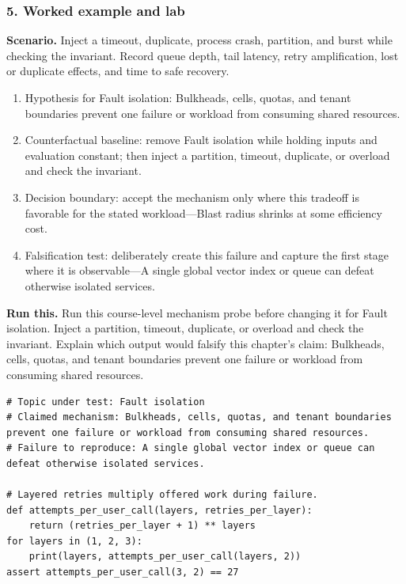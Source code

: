 \subsubsection*{5. Worked example and lab}
\textbf{Scenario.} Inject a timeout, duplicate, process crash, partition, and burst while checking the invariant. Record queue depth, tail latency, retry amplification, lost or duplicate effects, and time to safe recovery.
\begin{enumerate}
\item Hypothesis for Fault isolation: Bulkheads, cells, quotas, and tenant boundaries prevent one failure or workload from consuming shared resources.
\item Counterfactual baseline: remove Fault isolation while holding inputs and evaluation constant; then inject a partition, timeout, duplicate, or overload and check the invariant.
\item Decision boundary: accept the mechanism only where this tradeoff is favorable for the stated workload—Blast radius shrinks at some efficiency cost.
\item Falsification test: deliberately create this failure and capture the first stage where it is observable—A single global vector index or queue can defeat otherwise isolated services.
\end{enumerate}
\textbf{Run this.} Run this course-level mechanism probe before changing it for Fault isolation. Inject a partition, timeout, duplicate, or overload and check the invariant. Explain which output would falsify this chapter's claim: Bulkheads, cells, quotas, and tenant boundaries prevent one failure or workload from consuming shared resources.
\begin{Verbatim}[fontsize=\scriptsize]
# Topic under test: Fault isolation
# Claimed mechanism: Bulkheads, cells, quotas, and tenant boundaries prevent one failure or workload from consuming shared resources.
# Failure to reproduce: A single global vector index or queue can defeat otherwise isolated services.

# Layered retries multiply offered work during failure.
def attempts_per_user_call(layers, retries_per_layer):
    return (retries_per_layer + 1) ** layers
for layers in (1, 2, 3):
    print(layers, attempts_per_user_call(layers, 2))
assert attempts_per_user_call(3, 2) == 27
\end{Verbatim}
